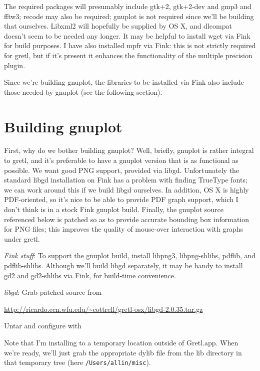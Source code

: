 \documentclass{article}
\begin{document}
The required packages will presumably include gtk+2, gtk+2-dev and
gmp3 and fftw3; recode may also be required; gnuplot is not required
since we'll be building that ourselves.  Libxml2 will hopefully be
supplied by OS X, and dlcompat doesn't seem to be needed any
longer. It may be helpful to install wget via Fink for build purposes.
I have also installed mpfr via Fink: this is not strictly required for
gretl, but if it's present it enhances the functionality of the
multiple precision plugin.

Since we're building gnuplot, the libraries to be installed via Fink
also include those needed by gnuplot (see the following section).

\section{Building gnuplot}
\label{sec:gpbuild}

First, why do we bother building gnuplot?  Well, briefly, gnuplot is
rather integral to gretl, and it's preferable to have a gnuplot
version that is as functional as possible.  We want good PNG support,
provided via libgd.  Unfortunately the standard libgd installation on
Fink has a problem with finding TrueType fonts; we can work around
this if we build libgd ourselves.  In addition, OS X is highly
PDF-oriented, so it's nice to be able to provide PDF graph support,
which I don't think is in a stock Fink gnuplot build.  Finally, the
gnuplot source referenced below is patched so as to provide accurate
bounding box information for PNG files; this improves the quality of
mouse-over interaction with graphs under gretl.

\textit{Fink stuff}: To support the gnuplot build, install libpng3,
libpng-shlibs, pdflib, and pdflib-shlibs.  Although we'll build libgd
separately, it may be handy to install gd2 and gd2-shlibs via Fink,
for build-time convenience.

\textit{libgd}: Grab patched source from

\url{http://ricardo.ecn.wfu.edu/~cottrell/gretl-osx/libgd-2.0.35.tar.gz}

Untar and configure with


Note that I'm installing to a temporary location outside of Gretl.app.
When we're ready, we'll just grab the appropriate dylib file from the
lib directory in that temporary tree (here
\texttt{/Users/allin/misc}).
\end{document}
